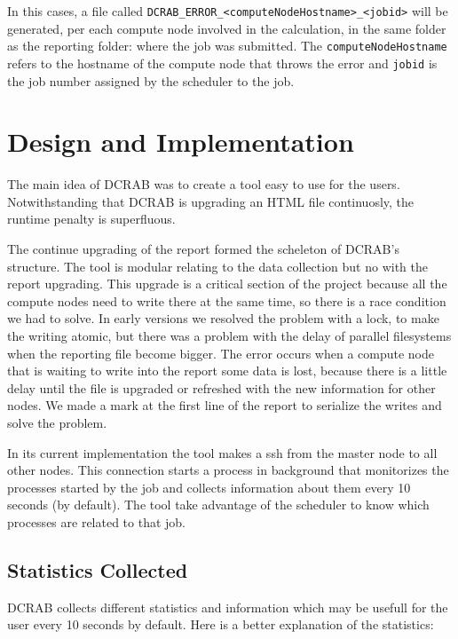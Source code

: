 \documentclass[10pt,a4paper]{report}
\begin{document}
In this cases, a file called \verb+DCRAB_ERROR_<computeNodeHostname>_<jobid>+ will be generated, per each compute node involved in the calculation, in the same folder as the reporting folder: where the job was submitted. The \verb+computeNodeHostname+ refers to the hostname of the compute node that throws the error and \verb+jobid+ is the job number assigned by the scheduler to the job.


\chapter{Design and Implementation}

The main idea of DCRAB was to create a tool easy to use for the users. Notwithstanding that DCRAB is upgrading an HTML file continuosly, the runtime penalty is superfluous.

The continue upgrading of the report formed the scheleton of DCRAB's structure. The tool is modular relating to the data collection but no with the report upgrading. This upgrade is a critical section of the project because all the compute nodes need to write there at the same time, so there is a race condition we had to solve. In early versions we resolved the problem with a lock, to make the writing atomic, but there was a problem with the delay of parallel filesystems when the reporting file become bigger. The error occurs when a compute node that is waiting to write into the report some data is lost, because there is a little delay until the file is upgraded or refreshed with the new information for other nodes. We made a mark at the first line of the report to serialize the writes and solve the problem.

In its current implementation the tool makes a ssh from the master node to all other nodes. This connection starts a process in background that monitorizes the processes started by the job and collects information about them every 10 seconds (by default). The tool take advantage of the scheduler to know which processes are related to that job.

\section{Statistics Collected}

DCRAB collects different statistics and information which may be usefull for the user every 10 seconds by default. Here is a better explanation of the statistics:
\end{document}
